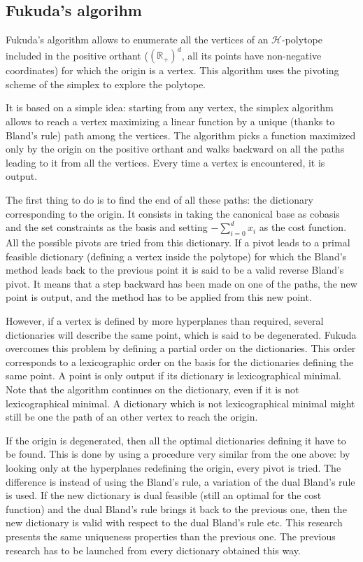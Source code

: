 \subsection{Fukuda's algorihm}

Fukuda's algorithm allows to enumerate all the vertices of an $\mathcal{H}$-polytope included in the positive orthant ($(\mathbb{R}_+)^d$, all its points have non-negative coordinates) for which the origin is a vertex. This algorithm uses the pivoting scheme of the simplex to explore the polytope. 

It is based on a simple idea: starting from any vertex, the simplex algorithm allows to reach a vertex maximizing a linear function by a unique (thanks to Bland's rule) path among the vertices. The algorithm picks a function maximized only by the origin on the positive orthant and walks backward on all the paths leading to it from all the vertices. Every time a vertex is encountered, it is output.

The first thing to do is to find the end of all these paths: the dictionary corresponding to the origin. It consists in taking the canonical base as cobasis and the set constraints as the basis and setting $-\sum_{i=0}^d x_i$ as the cost function. All the possible pivots are tried from this dictionary. If a pivot leads to a primal feasible dictionary (defining a vertex inside the polytope) for which the Bland's method leads back to the previous point it is said to be a valid reverse Bland's pivot. It means that a step backward has been made on one of the paths, the new point is output, and the method has to be applied from this new point.

However, if a vertex is defined by more hyperplanes than required, several dictionaries will describe the same point, which is said to be degenerated. Fukuda overcomes this problem by defining a partial order on the dictionaries. This order corresponds to a lexicographic order on the basis for the dictionaries defining the same point. A point is only output if its dictionary is lexicographical minimal. Note that the algorithm continues on the dictionary, even if it is not lexicographical minimal. A dictionary which is not lexicographical minimal might still be one the path of an other vertex to reach the origin.


If the origin is degenerated, then all the optimal dictionaries defining it have to be found. This is done by using a procedure very similar from the one above: by looking only at the hyperplanes redefining the origin, every pivot is tried. The difference is instead of using the Bland's rule, a variation of the dual Bland's rule is used. If the new dictionary is dual feasible (still an optimal for the cost function) and the dual Bland's rule brings it back to the previous one, then the new dictionary is valid with respect to the dual Bland's rule etc. This research presents the same uniqueness properties than the previous one. The previous research has to be launched from every dictionary obtained this way.

